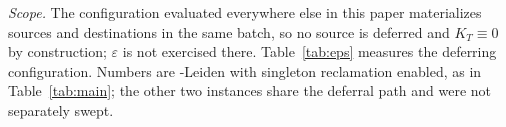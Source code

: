 \emph{Scope.} The configuration evaluated everywhere else in this paper
materializes sources and destinations in the same batch, so no source is deferred
and $K_T\equiv0$ by construction; $\varepsilon$ is not exercised there.
Table~\ref{tab:eps} measures the deferring configuration. Numbers are
\DyLo{}-Leiden with singleton reclamation enabled, as in Table~\ref{tab:main};
the other two instances share the deferral path and were not separately swept.
